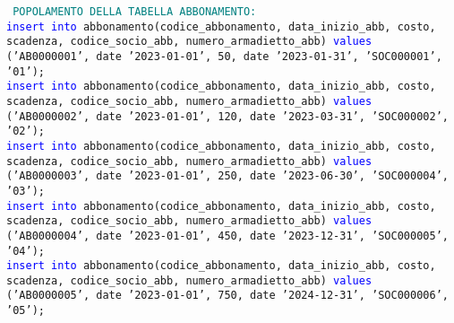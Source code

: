 \documentclass{article}
\begin{document}
    \begin{flushleft}
        \texttt{
        \textcolor{teal}{POPOLAMENTO DELLA TABELLA ABBONAMENTO:} \\
        \hspace*{0.5em}\textcolor{blue}{insert into} abbonamento(codice\_abbonamento, data\_inizio\_abb, costo, scadenza, \hspace*{0.5em}codice\_socio\_abb, numero\_armadietto\_abb) \textcolor{blue}{values} ('AB0000001', date '2023-01-01', \hspace*{0.5em}50, date '2023-01-31', 'SOC000001', '01'); \\
        \vspace{2mm}
        \hspace*{0.5em}\textcolor{blue}{insert into} abbonamento(codice\_abbonamento, data\_inizio\_abb, costo, scadenza, \hspace*{0.5em}codice\_socio\_abb, numero\_armadietto\_abb) \textcolor{blue}{values} ('AB0000002', date '2023-01-01', \hspace*{0.5em}120, date '2023-03-31', 'SOC000002', '02'); \\
        \vspace{2mm}
        \hspace*{0.5em}\textcolor{blue}{insert into} abbonamento(codice\_abbonamento, data\_inizio\_abb, costo, scadenza, \hspace*{0.5em}codice\_socio\_abb, numero\_armadietto\_abb) \textcolor{blue}{values} ('AB0000003', date '2023-01-01', \hspace*{0.5em}250, date '2023-06-30', 'SOC000004', '03'); \\
        \vspace{2mm}
        \hspace*{0.5em}\textcolor{blue}{insert into} abbonamento(codice\_abbonamento, data\_inizio\_abb, costo, scadenza, \hspace*{0.5em}codice\_socio\_abb, numero\_armadietto\_abb) \textcolor{blue}{values} ('AB0000004', date '2023-01-01', \hspace*{0.5em}450, date '2023-12-31', 'SOC000005', '04'); \\
        \vspace{2mm}
        \hspace*{0.5em}\textcolor{blue}{insert into} abbonamento(codice\_abbonamento, data\_inizio\_abb, costo, scadenza, \hspace*{0.5em}codice\_socio\_abb, numero\_armadietto\_abb) \textcolor{blue}{values} ('AB0000005', date '2023-01-01', \hspace*{0.5em}750, date '2024-12-31', 'SOC000006', '05'); \\
}
\end{flushleft}
\end{document}
